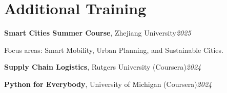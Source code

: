 \documentclass[11pt,a4paper]{article}
\newcommand{\cvline}[2]{%
	\noindent
	{#1}\hfill\textit{#2}
	\par\vspace{1pt}
}
\begin{document}
	
	
	\section{Additional Training}
	
	\cvline
	{\textbf{Smart Cities Summer Course},
		Zhejiang University}
	{2025}
	
	\vspace{1pt}
	
	\noindent
	\hspace{0.5em}
	\small
	Focus areas:
	Smart Mobility,
	Urban Planning,
	and Sustainable Cities.
	\normalsize
	
	\vspace{5pt}
	
	\cvline
	{\textbf{Supply Chain Logistics},
		Rutgers University (Coursera)}
	{2024}
	
	\vspace{3pt}
	
	\cvline
	{\textbf{Python for Everybody},
		University of Michigan (Coursera)}
	{2024}
	
	
	
\end{document}
